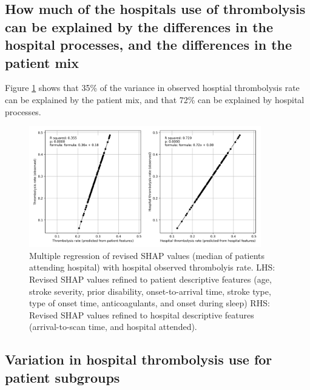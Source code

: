 \subsection{How much of the hospitals use of thrombolysis can be explained by the differences in the hospital processes, and the differences in the patient mix}

Figure \ref{fig:shap_multiple_regression} shows that 35\% of the variance in observed hosptial thrombolysis rate can be explained by the patient mix, and that 72\% can be explained by hospital processes.


\begin{figure}[!h]
    \centering
    \includegraphics[width=0.9\textwidth]{./images/03e_xgb_10_features_multiple_regression_patient_hosptial}
    \caption{Multiple regression of revised SHAP values (median of patients attending hospital) with hospital observed thrombolyis rate. LHS: Revised SHAP values refined to patient descriptive features (age, stroke severity, prior disability, onset-to-arrival time, stroke type, type of onset time, anticoagulants, and onset during sleep) RHS: Revised SHAP values refined to hospital descriptive features (arrival-to-scan time, and hospital attended). }
  \label{fig:shap_multiple_regression}
\end{figure}

\subsection{Variation in hospital thrombolysis use for patient subgroups}


